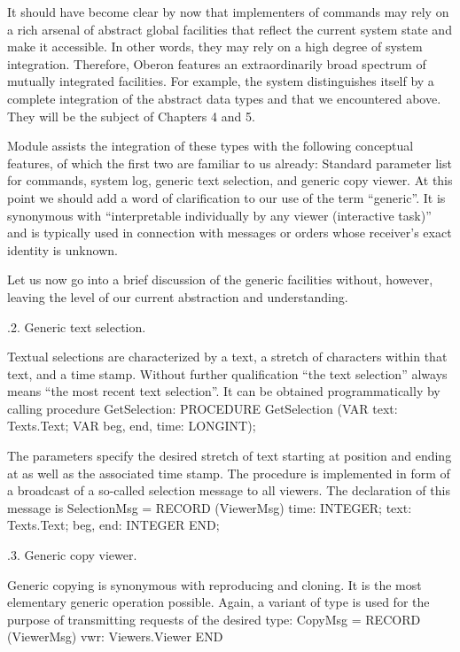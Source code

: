 \noindent It should have become clear by now that implementers of commands may
rely on a rich arsenal of abstract global facilities that reflect the
current system state and make it accessible. In other words, they may
rely on a high degree of system integration. Therefore, Oberon
features an extraordinarily broad spectrum of mutually integrated
facilities. For example, the system distinguishes itself by a complete
integration of the abstract data types  and  that we
encountered above. They will be the subject of Chapters 4 and 5.

Module  assists the integration of these types with the
following conceptual features, of which the first two are familiar to
us already: Standard parameter list for commands, system log, generic
text selection, and generic copy viewer. At this point we should add a
word of clarification to our use of the term ``generic''. It is
synonymous with ``interpretable individually by any viewer (interactive task)''
and is typically used in connection with messages or orders
whose receiver's exact identity is unknown.

Let us now go into a brief discussion of the generic facilities
without, however, leaving the level of our current abstraction and
understanding.

.2. Generic text selection.

Textual selections are characterized by a text, a stretch of
characters within that text, and a time stamp. Without further
qualification ``the text selection'' always means ``the most recent text selection''.
It can be obtained programmatically by calling procedure GetSelection:
\begintt
PROCEDURE GetSelection (VAR text: Texts.Text;
                        VAR beg, end, time: LONGINT);
\endtt

\noindent The parameters specify the desired stretch of text starting
at position  and ending at  as well as the associated time
stamp. The procedure is implemented in form of a broadcast of a so-called
selection message to all viewers. The declaration of this
message is
\begintt
SelectionMsg = RECORD (ViewerMsg)
  time: INTEGER;
  text: Texts.Text;
  beg, end: INTEGER
END;
\endtt

.3. Generic copy viewer.

Generic copying is synonymous with reproducing and cloning. It is the
most elementary generic operation possible. Again, a variant of type
 is used for the purpose of transmitting requests of the
desired type:
\begintt
CopyMsg = RECORD (ViewerMsg) vwr: Viewers.Viewer END
\endtt 


